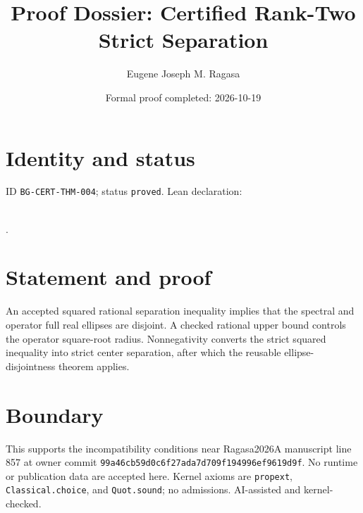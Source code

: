 \documentclass[11pt]{article}
\title{Proof Dossier: Certified Rank-Two Strict Separation}\author{Eugene Joseph M. Ragasa}\date{Formal proof completed: 2026-10-19}
\begin{document}
\maketitle
\section{Identity and status}
ID \texttt{BG-CERT-THM-004}; status \texttt{proved}. Lean declaration:
\par{}\\
{\tiny{}}.
\section{Statement and proof}
An accepted squared rational separation inequality implies that the spectral and operator
full real ellipses are disjoint. A checked rational upper bound controls the operator
square-root radius. Nonnegativity converts the strict squared inequality into strict
center separation, after which the reusable ellipse-disjointness theorem applies.
\section{Boundary}
This supports the incompatibility conditions near Ragasa2026A manuscript line 857 at
owner commit \texttt{99a46cb59d0c6f27ada7d709f194996ef9619d9f}. No runtime or
publication data are accepted here. Kernel axioms are \texttt{propext},
\texttt{Classical.choice}, and \texttt{Quot.sound}; no admissions. AI-assisted and
kernel-checked.
\end{document}
